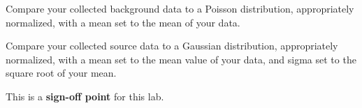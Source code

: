 \begin{plot} Compare your collected background data to a Poisson distribution,
appropriately normalized, with a mean set to the mean of your data. \end{plot}
\begin{plot} Compare your collected source data to a Gaussian distribution,
appropriately normalized, with a mean set to the mean value of your
data, and sigma set to the square root of your mean. \end{plot}

This is a \textbf{sign-off point} for this lab. 








